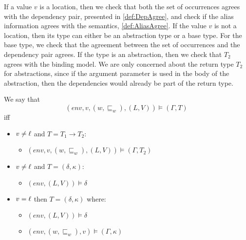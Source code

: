 \documentclass{llncs}
\newcommand{\sqleq}{\ensuremath{\sqsubseteq\xspace}}
\begin{document}
If a value $v$ is a location, then we check that both the set of occurrences agrees with the dependency pair, presented in \cref{def:DepAgree}, 
and check if the alias information agrees with the semantics, \cref{def:AliasAgree}.
If the value $v$ is not a location, then its type can either be an
abstraction type or a base type.
For the base type, we check that the agreement between the set of occurrences and the dependency pair agrees.
If the type is an abstraction, then we check that $T_2$ agrees with 
the binding model. 
We are only concerned about the return type $T_2$ for abstractions,
since if the argument parameter is used in the body of the
abstraction, then the dependencies would already be part of the return
type. 

\begin{definition}\label{def:TAgree}
	We say that
	$$(env,v,(w,\sqleq_w),(L,V))\models(\Gamma,T)$$
	iff
	\begin{itemize}
		\item $v\neq\ell$ and $T=T_1\rightarrow T_2$:
		\begin{itemize}
			\item $(env,v,(w,\sqleq_w),(L,V))\models(\Gamma,T_2)$
		\end{itemize}

		\item $v\neq\ell$ and $T=(\delta,\kappa)$:
		\begin{itemize}
			\item $(env,(L,V))\models\delta$
		\end{itemize}

		\item $v=\ell$ then $T=(\delta,\kappa)$ where:
		\begin{itemize}
			\item $(env,(L,V))\models\delta$
			\item $(env,(w,\sqleq_w),v)\models(\Gamma,\kappa)$
		\end{itemize}
	\end{itemize}
\end{definition}
\end{document}
